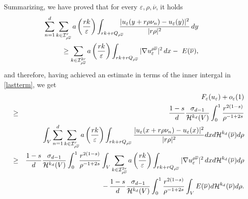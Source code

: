 \documentclass[11pt,a4paper,reqno]{amsart}
\theoremstyle{plain}
\theoremstyle{definition}
\newcommand\e{\varepsilon}
\theoremstyle{remark}
\begin{document}
Summarizing, we have proved that for every $\e, \rho, \overline{\nu}$, it holds
\begin{eqnarray}  \label{ineq}\nonumber
&&\hskip-2cm\sum_{n=1}^d \sum_{k\in \mathcal{I}^{r}_{{\rho\overline{\nu}}}} a\left(\frac{rk}{\e}\right) \int_{rk+rQ_{\rho\overline{\nu}}} \hskip-0.3cm\frac{|u_\e(y+r\rho\nu_n)-u_\e(y)|^2}{|r\rho|^2}\,dy \\
&&\geq \sum_{k\in \mathcal{I}^{2r}_{{\rho\overline{\nu}}}} a\left(\frac{rk}{\e}\right) \int_{rk+rQ_{\rho\overline{\nu}}} |\nabla u_\e^{\rho\overline{\nu}}|^2\,dx  
-\,\, E(\overline{\nu}),
\end{eqnarray}
and therefore, having achieved an estimate in terms of the inner intergal in \eqref{lastterm}, we get
\begin{eqnarray} && \nonumber \hskip-1.2cm F_\e(u_\e)+o_\e(1) \\ \nonumber
&\geq& \frac{1-s}{d} \frac{\sigma_{d-1}}{\mathcal{H}^{k_d}(V)} \int_0^1  \frac{r^{2(1-s)}}{\rho^{-1+2s}} \\ \label{midterm0}
&& \quad \quad \int_V  \sum_{n=1}^d \sum_{k\in \mathcal{I}^r_{\rho \overline{\nu}}}  a\left(\frac{rk}{\e}\right) \int_{rk+rQ_{\rho\overline{\nu}}}\frac{|u_\e(x+r\rho\nu_n)-u_\e(x)|^2}{|r\rho|^2} dx d\mathcal{H}^{k_d}(\overline{\nu}) d\rho \\ \label{midterm}
&\geq& \frac{1-s}{d} \frac{\sigma_{d-1}}{\mathcal{H}^{k_d}(V)} \int_0^1  \frac{r^{2(1-s)}}{\rho^{-1+2s}}\int_V \sum_{k\in \mathcal{I}^{2r}_{{\rho\overline{\nu}}}} a\left(\frac{rk}{\e}\right) \int_{rk+rQ_{\rho\overline{\nu}}} |\nabla u_\e^{\rho\overline{\nu}}|^2\,dx   d\mathcal{H}^{k_d}(\overline{\nu}) d\rho \\ \label{midterm2}
&& \qquad \qquad \qquad \qquad \qquad - \, \frac{1-s}{d} \frac{\sigma_{d-1}}{\mathcal{H}^{k_d}(V)} \int_0^1  \frac{r^{2(1-s)}}{\rho^{-1+2s}}\int_V E(\overline{\nu})  d\mathcal{H}^{k_d}(\overline{\nu}) d\rho. %
\end{eqnarray}
\end{document}

